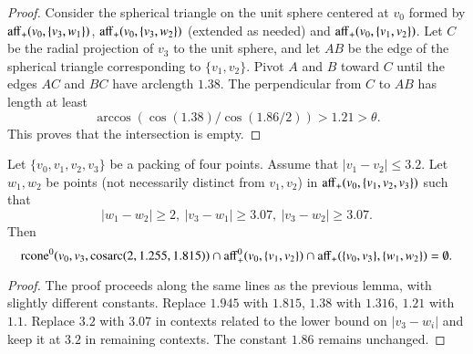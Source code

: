 \begin{tarskidata}
\begin{tarski}
\begin{proof}
Consider the spherical triangle on the unit sphere centered at $v_0$
formed by
 ${\operatorname{aff}}_+(v_0,\{v_3,w_1\})$, ${\operatorname{aff}}_+(v_0,\{v_3,w_2\})$ 
(extended as needed) and ${\operatorname{aff}}_+(v_0,\{v_1,v_2\})$. 
Let $C$ be the radial projection of
$v_3$ to the unit sphere, 
and let $AB$ be the edge of the spherical triangle corresponding to
$\{v_1,v_2\}$. Pivot $A$ and $B$ toward $C$ until the edges $AC$ and
$BC$ have arclength $1.38$.  The perpendicular from $C$ to $AB$
has length at least
    $$\arccos(\cos(1.38)/\cos(1.86/2))>1.21>\theta .$$
This proves that the intersection is empty.
\end{proof}
\end{tarski}




\begin{tarski}

\begin{lemma}
Let $\{v_0,v_1,v_2,v_3\}$ be a packing of four points.
Assume that $|v_1-v_2|\le 3.2$.  Let $w_1,w_2$ be points (not necessarily
distinct from $v_1,v_2$)
in ${\operatorname{aff}}_+(v_0,\{v_1,v_2,v_3\})$ such that
  $$|w_1-w_2|\ge 2,\ |v_3-w_1|\ge 3.07,\ |v_3-w_2|\ge 3.07.
  $$
Then 
  $${\operatorname{rcone}}^0(v_0,v_3,\operatorname{cosarc}(2,1.255,1.815)) \cap {\operatorname{aff}}_+^0(v_0,\{v_1,v_2\})
  \cap {\operatorname{aff}}_+(\{v_0,v_3\},\{w_1,w_2\})
=\emptyset .
  $$
\end{lemma}

\begin{proof}
The proof proceeds along the same lines as the previous lemma, with
slightly different constants. Replace $1.945$ with $1.815$, $1.38$ with
$1.316$, $1.21$ with $1.1$. Replace $3.2$ with $3.07$ in contexts related
to the lower bound on $|v_3-w_i|$ and keep it at $3.2$ in
remaining contexts. The constant $1.86$ remains unchanged.
\end{proof}
\end{tarski}



\begin{tarski}


\end{tarski}
\end{tarskidata}
